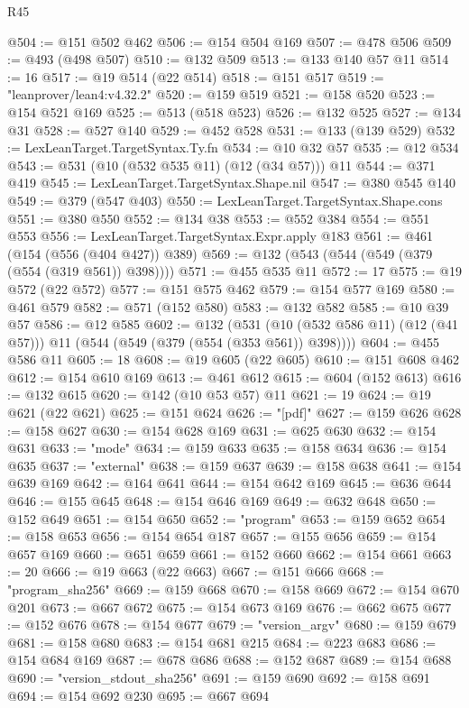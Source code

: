 \begin{lexlean}{R45}
\begin{coremodule}
@504 := @151 @502 @462
@506 := @154 @504 @169
@507 := @478 @506
@509 := @493 (@498 @507)
@510 := @132 @509
@513 := @133 @140 @57 @11
@514 := 16
@517 := @19 @514 (@22 @514)
@518 := @151 @517
@519 := "leanprover/lean4:v4.32.2"
@520 := @159 @519
@521 := @158 @520
@523 := @154 @521 @169
@525 := @513 (@518 @523)
@526 := @132 @525
@527 := @134 @31
@528 := @527 @140
@529 := @452 @528
@531 := @133 (@139 @529)
@532 := LexLeanTarget.TargetSyntax.Ty.fn
@534 := @10 @32 @57
@535 := @12 @534
@543 := @531 (@10 (@532 @535 @11) (@12 (@34 @57))) @11
@544 := @371 @419
@545 := LexLeanTarget.TargetSyntax.Shape.nil
@547 := @380 @545 @140
@549 := @379 (@547 @403)
@550 := LexLeanTarget.TargetSyntax.Shape.cons
@551 := @380 @550
@552 := @134 @38
@553 := @552 @384
@554 := @551 @553
@556 := LexLeanTarget.TargetSyntax.Expr.apply @183
@561 := @461 (@154 (@556 (@404 @427)) @389)
@569 := @132 (@543 (@544 (@549 (@379 (@554 (@319 @561)) @398))))
@571 := @455 @535 @11
@572 := 17
@575 := @19 @572 (@22 @572)
@577 := @151 @575 @462
@579 := @154 @577 @169
@580 := @461 @579
@582 := @571 (@152 @580)
@583 := @132 @582
@585 := @10 @39 @57
@586 := @12 @585
@602 := @132
    (@531 (@10 (@532 @586 @11) (@12 (@41 @57))) @11 (@544 (@549 (@379 (@554 (@353 @561)) @398))))
@604 := @455 @586 @11
@605 := 18
@608 := @19 @605 (@22 @605)
@610 := @151 @608 @462
@612 := @154 @610 @169
@613 := @461 @612
@615 := @604 (@152 @613)
@616 := @132 @615
@620 := @142 (@10 @53 @57) @11
@621 := 19
@624 := @19 @621 (@22 @621)
@625 := @151 @624
@626 := "[pdf]"
@627 := @159 @626
@628 := @158 @627
@630 := @154 @628 @169
@631 := @625 @630
@632 := @154 @631
@633 := "mode"
@634 := @159 @633
@635 := @158 @634
@636 := @154 @635
@637 := "external"
@638 := @159 @637
@639 := @158 @638
@641 := @154 @639 @169
@642 := @164 @641
@644 := @154 @642 @169
@645 := @636 @644
@646 := @155 @645
@648 := @154 @646 @169
@649 := @632 @648
@650 := @152 @649
@651 := @154 @650
@652 := "program"
@653 := @159 @652
@654 := @158 @653
@656 := @154 @654 @187
@657 := @155 @656
@659 := @154 @657 @169
@660 := @651 @659
@661 := @152 @660
@662 := @154 @661
@663 := 20
@666 := @19 @663 (@22 @663)
@667 := @151 @666
@668 := "program_sha256"
@669 := @159 @668
@670 := @158 @669
@672 := @154 @670 @201
@673 := @667 @672
@675 := @154 @673 @169
@676 := @662 @675
@677 := @152 @676
@678 := @154 @677
@679 := "version_argv"
@680 := @159 @679
@681 := @158 @680
@683 := @154 @681 @215
@684 := @223 @683
@686 := @154 @684 @169
@687 := @678 @686
@688 := @152 @687
@689 := @154 @688
@690 := "version_stdout_sha256"
@691 := @159 @690
@692 := @158 @691
@694 := @154 @692 @230
@695 := @667 @694

\end{coremodule}
\end{lexlean}
